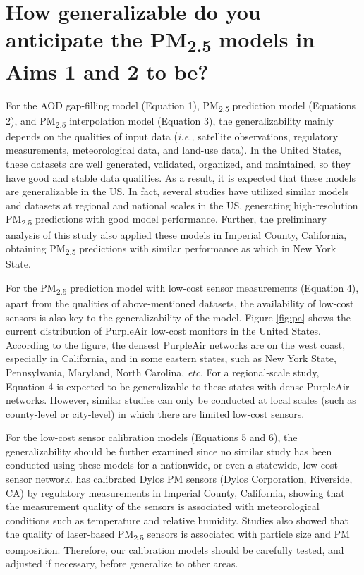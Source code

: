 \documentclass[11pt]{article}
\newcommand{\tsub}{\textsubscript}
\begin{document}
\section{How generalizable do you anticipate the \texorpdfstring{PM\tsub{2.5}}{PM2.5} models in Aims 1 and 2 to be?}
\begin{enumerate*}[{[a)]}]
    \item For the AOD gap-filling model (Equation 1), PM\tsub{2.5} prediction model (Equations 2), and PM\tsub{2.5} interpolation model (Equation 3), the generalizability mainly depends on the qualities of input data (\textit{i.e.,} satellite observations, regulatory measurements, meteorological data, and land-use data). In the United States, these datasets are well generated, validated, organized, and maintained, so they have good and stable data qualities. As a result, it is expected that these models are generalizable in the US. In fact, several studies \citep{kloog2011assessing, kloog2012incorporating, hu2017estimating, di2016assessing} have utilized similar models and datasets at regional and national scales in the US, generating high-resolution PM\tsub{2.5} predictions with good model performance. Further, the preliminary analysis of this study also applied these models in Imperial County, California, obtaining PM\tsub{2.5} predictions with similar performance as which in New York State. 
    
    For the PM\tsub{2.5} prediction model with low-cost sensor measurements (Equation 4), apart from the qualities of above-mentioned datasets, the availability of low-cost sensors is also key to the generalizability of the model. Figure \ref{fig:pa} shows the current distribution of PurpleAir low-cost monitors in the United States. According to the figure, the densest PurpleAir networks are on the west coast, especially in California, and in some eastern states, such as New York State, Pennsylvania, Maryland, North Carolina, \textit{etc.} For a regional-scale study, Equation 4 is expected to be generalizable to these states with dense PurpleAir networks. However, similar studies can only be conducted at local scales (such as county-level or city-level) in which there are limited low-cost sensors. 
    
    For the low-cost sensor calibration models (Equations 5 and 6), the generalizability should be further examined since no similar study has been conducted using these models for a nationwide, or even a statewide, low-cost sensor network. \citet{carvlin2017development} has calibrated Dylos PM sensors (Dylos Corporation, Riverside, CA) by regulatory measurements in Imperial County, California, showing that the measurement quality of the sensors is associated with meteorological conditions such as temperature and relative humidity. Studies \citep{broday2017wireless, castell2017can} also showed that the quality of laser-based PM\tsub{2.5} sensors is associated with particle size and PM composition. Therefore, our calibration models should be carefully tested, and adjusted if necessary, before generalize to other areas. 
    

\end{enumerate*}
\end{document}
